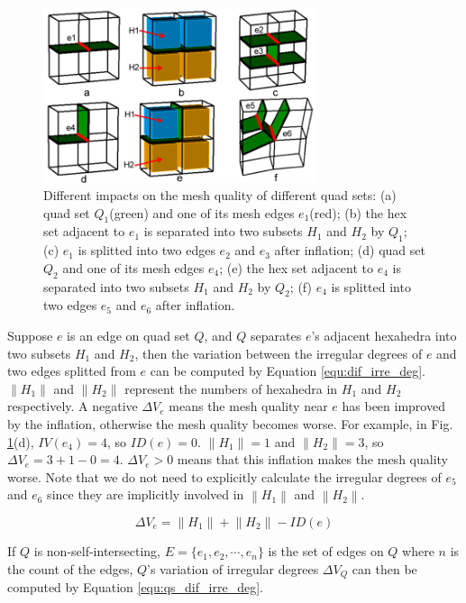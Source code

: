 \documentclass[final,5p,times,twocolumn]{elsarticle}
\begin{document}
\begin{figure}[htbp]
\begin{center}
\includegraphics[width=8cm]{quality_impact_qs.png}
\caption{Different impacts on the mesh quality of different quad sets: (a) quad set $Q_1$(green) and one of its mesh edges $e_1$(red); (b) the hex set adjacent to $e_1$ is separated into two subsets $H_1$ and $H_2$ by $Q_1$; (c) $e_1$ is splitted into two edges $e_2$ and $e_3$ after inflation; (d) quad set $Q_2$ and one of its mesh edges $e_4$; (e) the hex set adjacent to $e_4$ is separated into two subsets $H_1$ and $H_2$ by $Q_2$; (f) $e_4$ is splitted into two edges $e_5$ and $e_6$ after inflation.}
\label{fig:quality_impact_qs}
\end{center}
\end{figure}

Suppose $e$ is an edge on quad set $Q$, and $Q$ separates $e$'s adjacent hexahedra into two subsets $H_1$ and $H_2$, then the variation between the irregular degrees of $e$ and two edges splitted from $e$ can be computed by Equation \ref{equ:dif_irre_deg}. $\left \| H_1 \right \|$ and $\left \| H_2 \right \|$ represent the numbers of hexahedra in $H_1$ and $H_2$ respectively. A negative $\Delta V_e$ means the mesh quality near $e$ has been improved by the inflation, otherwise the mesh quality becomes worse. For example, in Fig. \ref{fig:quality_impact_qs}(d), $IV(e_4)=4$, so $ID(e)=0$. $\left \| H_1 \right \| = 1$ and $\left \| H_2 \right \| = 3$, so $\Delta V_e=3+1-0=4$. $\Delta V_e > 0$ means that this inflation makes the mesh quality worse. Note that we do not need to explicitly calculate the irregular degrees of $e_5$ and $e_6$ since they are implicitly involved in $\left \| H_1 \right \|$ and $\left \| H_2 \right \|$.

\begin{equation}
\label{equ:dif_irre_deg}
\Delta V_e=\left \| H_1 \right \| + \left \| H_2 \right \|-ID(e)
\end{equation}

If $Q$ is non-self-intersecting, $E=\{e_1,e_2,\cdots,e_n\}$ is the set of edges on $Q$ where $n$ is the count of the edges, $Q$'s variation of irregular degrees $\Delta V_Q$ can then be computed by Equation \ref{equ:qs_dif_irre_deg}.
\end{document}
